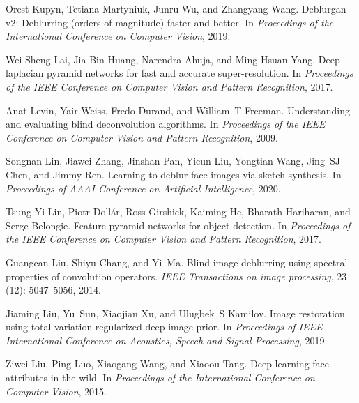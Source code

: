 \documentclass[final]{cvpr}
\begin{document}
{\begin{thebibliography}{43}
Orest Kupyn, Tetiana Martyniuk, Junru Wu, and Zhangyang Wang.
\newblock Deblurgan-v2: Deblurring (orders-of-magnitude) faster and better.
\newblock In \emph{Proceedings of the International Conference on Computer
  Vision}, 2019.

Wei-Sheng Lai, Jia-Bin Huang, Narendra Ahuja, and Ming-Hsuan Yang.
\newblock Deep laplacian pyramid networks for fast and accurate
  super-resolution.
\newblock In \emph{Proceedings of the {IEEE} Conference on Computer Vision and
  Pattern Recognition}, 2017.

Anat Levin, Yair Weiss, Fredo Durand, and William~T Freeman.
\newblock Understanding and evaluating blind deconvolution algorithms.
\newblock In \emph{Proceedings of the {IEEE} Conference on Computer Vision and
  Pattern Recognition}, 2009.

Songnan Lin, Jiawei Zhang, Jinshan Pan, Yicun Liu, Yongtian Wang, Jing~SJ Chen,
  and Jimmy Ren.
\newblock Learning to deblur face images via sketch synthesis.
\newblock In \emph{Proceedings of AAAI Conference on Artificial Intelligence},
  2020.

Tsung-Yi Lin, Piotr Doll{\'a}r, Ross Girshick, Kaiming He, Bharath Hariharan,
  and Serge Belongie.
\newblock Feature pyramid networks for object detection.
\newblock In \emph{Proceedings of the {IEEE} Conference on Computer Vision and
  Pattern Recognition}, 2017.

Guangcan Liu, Shiyu Chang, and Yi~Ma.
\newblock Blind image deblurring using spectral properties of convolution
  operators.
\newblock \emph{IEEE Transactions on image processing}, 23
  (12): 5047--5056, 2014.

Jiaming Liu, Yu~Sun, Xiaojian Xu, and Ulugbek~S Kamilov.
\newblock Image restoration using total variation regularized deep image prior.
\newblock In \emph{Proceedings of IEEE International Conference on Acoustics,
  Speech and Signal Processing}, 2019.

Ziwei Liu, Ping Luo, Xiaogang Wang, and Xiaoou Tang.
\newblock Deep learning face attributes in the wild.
\newblock In \emph{Proceedings of the International Conference on Computer
  Vision}, 2015.


\end{thebibliography}}
\end{document}
